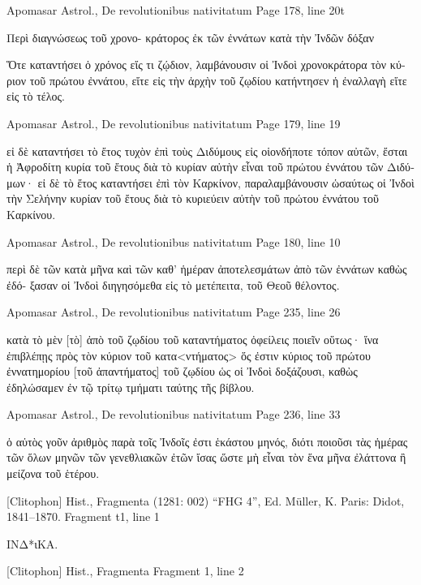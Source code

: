 \documentclass[12pt,letterpaper,twoside,final]{memoir}
\begin{document}
\begin{greek}
Apomasar Astrol., De revolutionibus nativitatum 
Page 178, line 20t

                    Περὶ διαγνώσεως τοῦ χρονο-
κράτορος ἐκ τῶν ἐννάτων κατὰ τὴν Ἰνδῶν δόξαν


 Ὅτε καταντήσει ὁ χρόνος εἴς τι ζῴδιον, λαμβάνουσιν οἱ 
Ἰνδοὶ χρονοκράτορα τὸν κύριον τοῦ πρώτου ἐννάτου, εἴτε   
εἰς τὴν ἀρχὴν τοῦ ζῳδίου κατήντησεν ἡ ἐναλλαγὴ εἴτε εἰς 
τὸ τέλος. 



Apomasar Astrol., De revolutionibus nativitatum 
Page 179, line 19

                                   εἰ δὲ καταντήσει τὸ ἔτος 
τυχὸν ἐπὶ τοὺς Διδύμους εἰς οἱονδήποτε τόπον αὐτῶν, 
ἔσται ἡ Ἀφροδίτη κυρία τοῦ ἔτους διὰ τὸ κυρίαν αὐτὴν 
εἶναι τοῦ πρώτου ἐννάτου τῶν Διδύμων· εἰ δὲ τὸ ἔτος 
καταντήσει ἐπὶ τὸν Καρκίνον, παραλαμβάνουσιν ὡσαύτως 
οἱ Ἰνδοὶ τὴν Σελήνην κυρίαν τοῦ ἔτους διὰ τὸ κυριεύειν 
αὐτὴν τοῦ πρώτου ἐννάτου τοῦ Καρκίνου. 



Apomasar Astrol., De revolutionibus nativitatum 
Page 180, line 10

                          περὶ δὲ τῶν κατὰ μῆνα καὶ τῶν καθ' 
ἡμέραν ἀποτελεσμάτων ἀπὸ τῶν ἐννάτων καθὼς ἐδό-
ξασαν οἱ Ἰνδοὶ διηγησόμεθα εἰς τὸ μετέπειτα, τοῦ Θεοῦ 
θέλοντος. 



Apomasar Astrol., De revolutionibus nativitatum 
Page 235, line 26

                           κατὰ τὸ μὲν [τὸ] ἀπὸ τοῦ ζῳδίου 
τοῦ καταντήματος ὀφείλεις ποιεῖν οὕτως· ἵνα ἐπιβλέπῃς 
πρὸς τὸν κύριον τοῦ κατα<ντήματος> ὅς ἐστιν κύριος τοῦ 
πρώτου ἐννατημορίου [τοῦ ἀπαντήματος] τοῦ ζῳδίου ὡς 
οἱ Ἰνδοὶ δοξάζουσι, καθὼς ἐδηλώσαμεν ἐν τῷ τρίτῳ 
τμήματι ταύτης τῆς βίβλου. 



Apomasar Astrol., De revolutionibus nativitatum 
Page 236, line 33

                                      ὁ αὐτὸς γοῦν ἀριθμὸς παρὰ τοῖς 
Ἰνδοῖς ἐστι ἑκάστου μηνός, διότι ποιοῦσι τὰς ἡμέρας τῶν 
ὅλων μηνῶν τῶν γενεθλιακῶν ἐτῶν ἴσας ὥστε μὴ εἶναι τὸν   
ἕνα μῆνα ἐλάττονα ἢ μείζονα τοῦ ἑτέρου. 




[Clitophon] Hist., Fragmenta (1281: 002)
“FHG 4”, Ed. Müller, K.
Paris: Didot, 1841–1870.
Fragment t1, line 1

ΙΝΔ*ιΚΑ. 




[Clitophon] Hist., Fragmenta 
Fragment 1, line 2


\end{greek}
\end{document}
